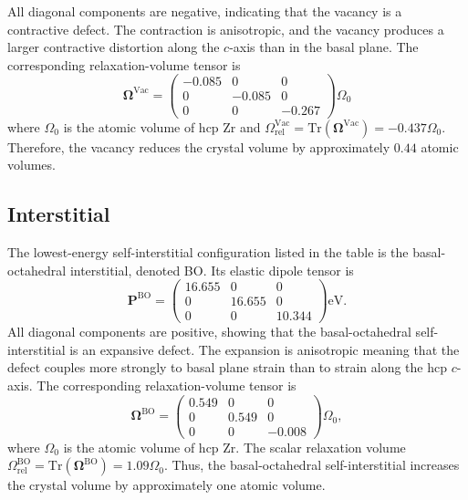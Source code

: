\documentclass[10pt]{article}
\begin{document}
All diagonal components are negative, indicating that the vacancy is a contractive defect. The contraction is anisotropic, and the vacancy produces a larger contractive distortion along the $c$-axis than in the basal plane. The corresponding relaxation-volume tensor is 
\begin{equation} 
\boldsymbol{\Omega}^{\mathrm{Vac}} = 
\begin{pmatrix} 
-0.085 & 0 & 0 \\
0 & -0.085 & 0 \\ 
0 & 0 & -0.267 
\end{pmatrix} \Omega_0
\end{equation} 
where $\Omega_0$ is the atomic volume of hcp Zr and $\Omega_{\mathrm{rel}}^{\mathrm{Vac}} = \mathrm{Tr}\left(\boldsymbol{\Omega}^{\mathrm{Vac}}\right) = -0.437\Omega_0$. Therefore, the vacancy reduces the crystal volume by approximately $0.44$ atomic volumes.

\subsection{Interstitial}

The lowest-energy self-interstitial configuration listed in the table is the basal-octahedral interstitial, denoted BO. Its elastic dipole tensor is 
\begin{equation} 
\mathbf{P}^{\mathrm{BO}} = 
\begin{pmatrix} 
16.655 & 0 & 0 \\ 
0 & 16.655 & 0 \\ 
0 & 0 & 10.344 
\end{pmatrix} \mathrm{eV}. 
\end{equation} 
All diagonal components are positive, showing that the basal-octahedral self-interstitial is an expansive defect. The expansion is anisotropic meaning that the defect couples more strongly to basal plane strain than to strain along the hcp $c$-axis. The corresponding relaxation-volume tensor is 
\begin{equation} 
\boldsymbol{\Omega}^{\mathrm{BO}} = 
\begin{pmatrix} 
0.549 & 0 & 0 \\ 
0 & 0.549 & 0 \\ 
0 & 0 & -0.008 
\end{pmatrix} \Omega_0,
\end{equation} 
where $\Omega_0$ is the atomic volume of hcp Zr. The scalar relaxation volume $\Omega_{\mathrm{rel}}^{\mathrm{BO}} = \mathrm{Tr}\left(\boldsymbol{\Omega}^{\mathrm{BO}}\right) = 1.09\Omega_0 $. Thus, the basal-octahedral self-interstitial increases the crystal volume by approximately one atomic volume. 
\end{document}
